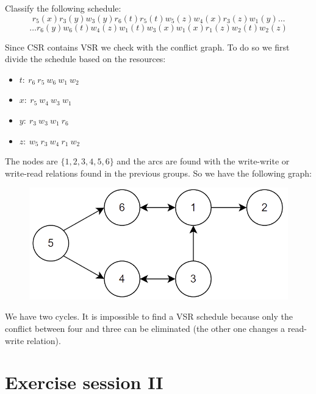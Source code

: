 \documentclass[12pt, a4paper]{report}
\newtheorem[style=M,bodystyle=\normalfont]{theorem}{Theorem}
\newtheorem[style=M,bodystyle=\normalfont]{corollary}{Corollary}
\newtheorem[style=M,bodystyle=\normalfont]{lemma}{Lemma}
\newtheorem[style=M,bodystyle=\normalfont]{definition}{Definition}
\begin{document}
    \begin{Exercise}[label=6]
        Classify the following schedule: 
        \[r_5(x) r_3(y) w_3(y) r_6(t) r_5(t) w_5(z) w_4(x) r_3(z) w_1(y) \dots\]
        \[\dots r_6(y) w_6(t) w_4(z) w_1(t) w_3(x) w_1(x) r_1(z) w_2(t) w_2(z)\]
    \end{Exercise}
    \begin{Answer}[ref=6]
        Since CSR contains VSR we check with the conflict graph. To do so we first divide the schedule based on the resources: 
        \begin{itemize}
            \item $t: \: r_6 \: r_5 \: w_6 \: w_1 \: w_2$
            \item $x: \: r_5 \: w_4 \: w_3 \: w_1$
            \item $y: \: r_3 \: w_3 \: w_1 \: r_6$
            \item $z: \: w_5 \: r_3 \: w_4 \: r_1 \: w_2$
        \end{itemize}
        The nodes are $\{1,2,3,4,5,6\}$ and the arcs are found with the write-write or write-read relations found in the previous groups. So we have the following graph:
        \begin{figure}[H]
            \centering
            \includegraphics[width=0.5\linewidth]{images/conflictgraph3.png}
        \end{figure}
        We have two cycles. It is impossible to find a VSR schedule because only the conflict between four and three can be eliminated (the other one changes a read-write relation).
    \end{Answer}

    \newpage

    \chapter{Exercise session II}
\end{document}
